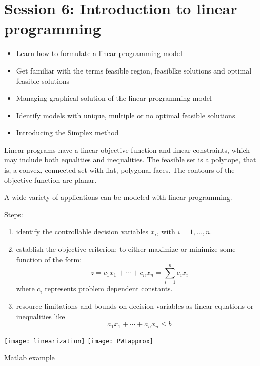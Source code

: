 \section{Session 6: Introduction to linear programming}



\begin{itemize}
  \item Learn how to formulate a linear programming model
  \item Get familiar with the terms feasible region, feasiblke solutions and optimal feasible solutions
  \item Managing graphical solution of the linear programming model
  \item Identify models with unique, multiple or no optimal feasible solutions
  \item Introducing the Simplex method
\end{itemize}


    Linear programs have a linear objective function and linear constraints, which may
    include both equalities and inequalities. The feasible set is a polytope, that is, a convex,
    connected set with ﬂat, polygonal faces. The contours of the objective function are planar.
   \cite{nocedal_numerical_2006}

  A wide variety of applications can be modeled with linear programming.


  Steps:
\begin{enumerate}
  \item identify the controllable decision variables $x_i$, with $i=1,\ldots,n$.
  \item establish the objective criterion: to either maximize or minimize some function of the form:
  \[
    z = c_1 x_1 +\cdots + c_n x_n = \sum_{i=1}^n c_i x_i
  \]
  where $c_i$ represents problem dependent constants.
  \item resource limitations and bounds on decision variables as linear equations or inequalities like
  \[
     a_1 x_1 +\cdots + a_n x_n \leq b
  \]
\end{enumerate}

  \begin{center}
    \texttt{[image: linearization]}
    \texttt{[image: PWLapprox]}

  \href{https://es.mathworks.com/help/slcontrol/ug/linearizing-nonlinear-models.html}{Matlab example}
  \end{center}

